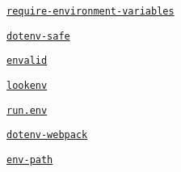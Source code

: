 \begin{DoxyItemize}
\item \href{https://github.com/bjoshuanoah/require-environment-variables}{\tt require-\/environment-\/variables}
\item \href{https://github.com/rolodato/dotenv-safe}{\tt dotenv-\/safe}
\item \href{https://github.com/af/envalid}{\tt envalid}
\item \href{https://github.com/RodrigoEspinosa/lookenv}{\tt lookenv}
\item \href{https://www.npmjs.com/package/run.env}{\tt run.\+env}
\item \href{https://github.com/mrsteele/dotenv-webpack}{\tt dotenv-\/webpack}
\item \href{https://github.com/benrei/env-path}{\tt env-\/path} 
\end{DoxyItemize}